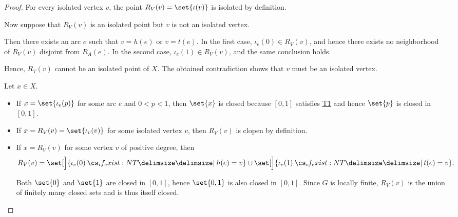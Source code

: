 \begin{proof}

  \SufficiencySubProof* For every isolated vertex \( v \), the point \( R_V(v) = \set{ \iota(v) } \) is isolated by definition.

  \NecessitySubProof* Now suppose that \( R_V(v) \) is an isolated point but \( v \) is not an isolated vertex.

  Then there exists an arc \( e \) such that \( v = h(e) \) or \( v = t(e) \). In the first case, \( \iota_e(0) \in R_V(v) \), and hence there exists no neighborhood of \( R_V(v) \) disjoint from \( R_A(e) \). In the second case, \( \iota_e(1) \in R_V(v) \), and the same conclusion holds.

  Hence, \( R_V(v) \) cannot be an isolated point of \( X \). The obtained contradiction shows that \( v \) must be an isolated vertex.

   Let \( x \in X \).

  \begin{itemize}
    \item If \( x = \set{ \iota_e(p) } \) for some arc \( e \) and \( 0 < p < 1 \), then \( \set{ x } \) is closed because \( [0, 1] \) satisfies \hyperref[def:separation_axioms/T1]{T1} and hence \( \set{ p } \) is closed in \( [0, 1] \).

    \item If \( x = R_V(v) = \set{ \iota_v(v) } \) for some isolated vertex \( v \), then \( R_V(v) \) is clopen by definition.

    \item If \( x = R_V(v) \) for some vertex \( v \) of positive degree, then
    \begin{equation*}
      R_V(v) = \set[\Big]{ \iota_e(0) \given* h(e) = v } \cup \set[\Big]{ \iota_e(1) \given* t(e) = v }.
    \end{equation*}

    Both \( \set{ 0 } \) and \( \set{ 1 } \) are closed in \( [0, 1] \), hence \( \set{ 0, 1 } \) is also closed in \( [0, 1] \). Since \( G \) is locally finite, \( R_V(v) \) is the union of finitely many closed sets and is thus itself closed.
  \end{itemize}
\end{proof}

